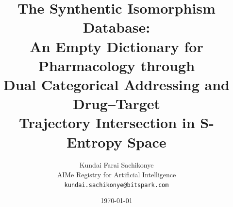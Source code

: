 \documentclass[11pt,twocolumn,a4paper]{article}
\theoremstyle{definition}
\theoremstyle{remark}
\begin{document}
\title{\textbf{The Synthentic Isomorphism Database: \\
An Empty Dictionary for Pharmacology through \\
Dual Categorical Addressing and Drug--Target \\
Trajectory Intersection in S-Entropy Space}}

\author{
Kundai Farai Sachikonye\\[0.3em]
AIMe Registry for Artificial Intelligence\\[0.3em]
\texttt{kundai.sachikonye@bitspark.com}
}

\date{\today}

\maketitle
\end{document}
